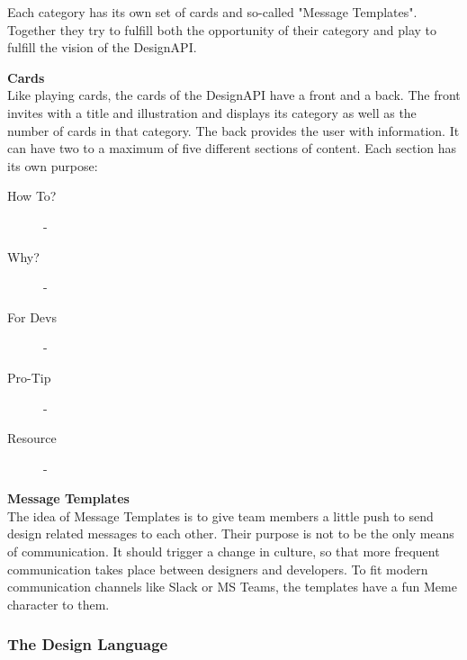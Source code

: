Each category has its own set of cards and so-called "Message Templates". Together they try to
fulfill both the opportunity of their category and play to fulfill the vision of the DesignAPI.

\textbf{Cards}\\
Like playing cards, the cards of the DesignAPI have a front and a back. The front invites with a
title and illustration and displays its category as well as the number of cards in that category.
The back provides the user with information. It can have two to a maximum of five different sections
of content. Each section has its own purpose: 

\begin{description}
    \item[How To?] -
    \item[Why?] -
    \item[For Devs] -
    \item[Pro-Tip] -
    \item[Resource] -
\end{description}

\textbf{Message Templates}\\
The idea of Message Templates is to give team members a little push to send design related messages
to each other. Their purpose is not to be the only means of communication. It should trigger a
change in culture, so that more frequent communication takes place between designers and developers.
To fit modern communication channels like Slack or MS Teams, the templates have a fun Meme character
to them.



\subsubsection{The Design Language}


% 


